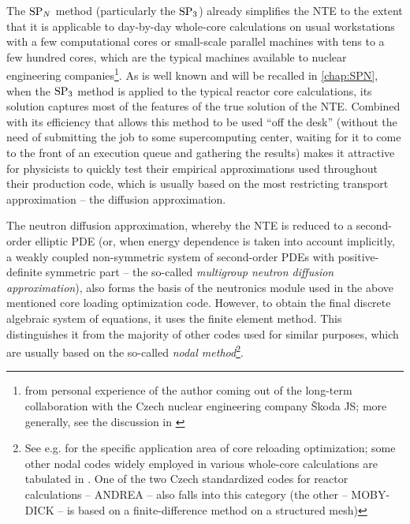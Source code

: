 The $\SPN$ method (particularly the $\SPN[3]$) already simplifies the NTE to the extent that it is applicable to
day-by-day whole-core calculations on usual workstations with a few computational cores or small-scale parallel machines
with tens to a few hundred cores, which are the typical machines available to nuclear engineering
companies\footnote{\label{sjsexp}from personal experience of the author coming out of the long-term collaboration with
the Czech nuclear engineering company {\v S}koda JS; more generally, see the discussion in \cite[Sec.
2.4]{Sanchez7}}. As is well known and will be recalled in \cref{chap:SPN}, when the $\SPN[3]$ method is applied to the
typical reactor core calculations, its solution captures most of the features of the true solution of the NTE. Combined
with its efficiency that allows this method to be used ``off the desk'' (without the need of submitting the job to some
supercomputing center, waiting for it to come to the front of an execution queue and gathering the results) makes it
attractive for physicists to quickly test their empirical approximations used throughout their production code, which is
usually based on the most restricting transport approximation -- the diffusion approximation.

The neutron diffusion approximation, whereby the NTE is reduced to a second-order elliptic PDE (or, when energy
dependence is taken into account implicitly, a weakly coupled non-symmetric system of second-order PDEs with
positive-definite symmetric part -- the so-called \textit{multigroup neutron diffusion approximation}), also forms the
basis of the neutronics module used in the above mentioned core loading optimization code. However, to obtain the final
discrete algebraic system of equations, it uses the finite element method. This distinguishes it from the majority of 
other codes used for similar purposes, which are usually based on the so-called \textit{nodal method}\footnote{See e.g.
\cite{opt1,opt2,opt3} for the specific application area of core reloading optimization; some other nodal codes widely
employed in various whole-core calculations are tabulated in \cite{mox-bench}. One of the two Czech standardized codes
for reactor calculations -- ANDREA \cite{ANDREA} -- also falls into this category (the other -- MOBY-DICK
\cite{MOBYDICK} -- is based on a finite-difference method on a structured mesh)\label{ftn:nodal}}.

